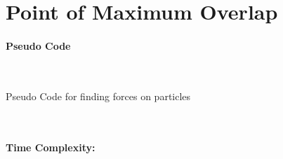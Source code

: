 \documentclass[pdftex,a4paper,12pt]{report}
\begin{document}
\newpage
\section{Point of Maximum Overlap}

\paragraph{Pseudo Code}\mbox{} \\
\begin{algorithm}


\caption{Pseudo Code for finding forces on particles}
\end{algorithm}
\\
\paragraph{Time Complexity:} \makebox[2pt]{}\\
\end{document}
